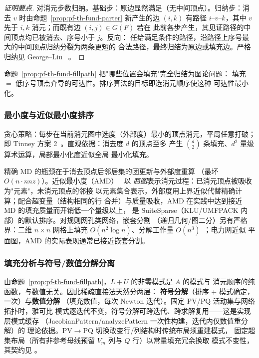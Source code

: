 \begin{proof}[证明要点]
对消元步数归纳。基础步：原边显然满足（无中间顶点）。归纳步：消去 $v$
时由命题~\ref{prop:pf-th-fund-parter} 新产生的边 $(i,k)$ 有路径
$i$--$v$--$k$，其中 $v$ 先于 $i,k$ 消元；而既有边 $(i,j)\in G(F)$ 若在
此前各步产生，其见证路径的中间顶点均已被消去、序号小于 $j$。反向：
任给满足条件的路径，沿路径上序号最大的中间顶点归纳分裂为两条更短的
合法路径，最终归结为原边或填充边。严格归纳见 George--Liu
~\cite{pff:george-liu}。
\end{proof}

命题~\ref{prop:pf-th-fund-fillpath} 把"哪些位置会填充"完全归结为图论问题：
填充 $=$ 低序号顶点介导的可达性。排序算法的目标即选消元顺序使这种
可达性最小化。

\subsubsection{最小度与近似最小度排序}

\begin{definition}[最小度（MD）排序]\label{def:pf-th-fund-md}
贪心策略：每步在当前消元图中选度（外部度）最小的顶点消元，平局任意打破；
即 Tinney 方案 2~\cite{pff:tinney-walker}。直观依据：消去度 $d$ 的顶点至多
产生 $\binom{d}{2}$ 条填充、$d^2$ 量级算术运算，局部最小化度近似全局
最小化填充。
\end{definition}

\begin{remark}\label{rem:pf-th-fund-amd}
精确 MD 的瓶颈在于消去顶点后邻居集的团更新与外部度重算
（最坏 $O(n\cdot nnz)$）。近似最小度（AMD）~\cite{pff:amestoy-amd} 以
\emph{商图}表示消元过程：已消元顶点被吸收为"元素"，未消元顶点的邻接
以元素集合表示，外部度用上界近似代替精确计算；配合超变量（结构相同的行
合并）与质量吸收，AMD 在实践中达到接近 MD 的填充质量而开销低一个量级以上，
是 SuiteSparse（KLU/UMFPACK 内部）的默认排序。对规则网孔类网络，嵌套分割
（递归几何/图二分）另有严格界：二维 $n\times n$ 网格上填充
$O(n^2\log n)$、分解工作量 $O(n^3)$~\cite{pff:george-nested}；电力网近似
平面图，AMD 的实际表现通常已接近嵌套分割。
\end{remark}

\subsubsection{填充分析与符号/数值分解分离}

由命题~\ref{prop:pf-th-fund-fillpath}，$L+U$ 的非零模式是 $A$ 的模式与
消元顺序的纯函数，与数值无关。因此稀疏直接法天然分两层：
\textbf{符号分解}（排序 + 模式确定，一次）与\textbf{数值分解}
（填充数值，每次 Newton 迭代）。固定 PV/PQ 活动集与网络拓扑时，雅可比
模式逐迭代不变，符号分解可跨迭代、跨求解复用——这是实现层模式缓存
（JacobianPattern/analyzePattern 一次性构建，迭代内仅数值重分解）的
理论依据。PV$\to$PQ 切换改变行/列结构时传统布局须重建模式，
固定超集布局（所有非参考母线预留 $V_m$ 列与 $Q$ 行）以常量填充冗余换取
模式不变性，其契约见 。

